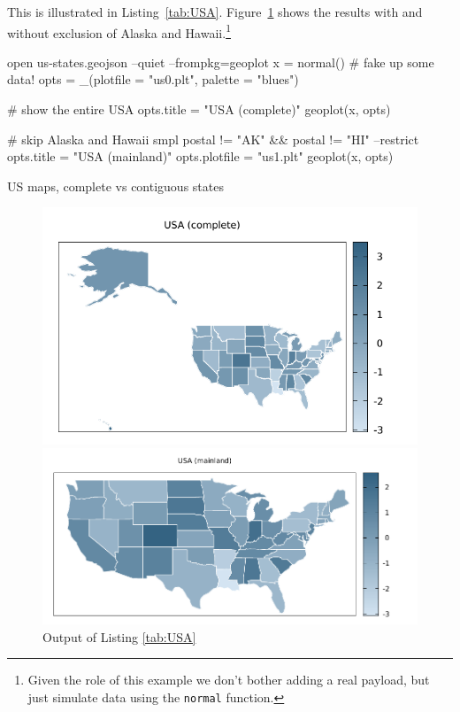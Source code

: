 \documentclass{article}
\begin{document}
This is illustrated in Listing~\ref{tab:USA}. Figure~\ref{fig:USA}
shows the results with and without exclusion of Alaska and
Hawaii.\footnote{Given the role of this example we don't bother adding
  a real payload, but just simulate data using the \texttt{normal}
  function.}

\begin{script}[p]
  \begin{scode}
open us-states.geojson --quiet --frompkg=geoplot
x = normal() # fake up some data!
opts = _(plotfile = "us0.plt", palette = "blues")

# show the entire USA
opts.title = "USA (complete)"
geoplot(x, opts)

# skip Alaska and Hawaii
smpl postal != "AK" && postal != "HI" --restrict
opts.title = "USA (mainland)"
opts.plotfile = "us1.plt"
geoplot(x, opts)
  \end{scode}
  \caption{US maps, complete vs contiguous states}
  \label{tab:USA}
\end{script}

\begin{figure}[p]
  \begin{center}
  \includegraphics[scale=0.9]{us0.pdf}

  \includegraphics[scale=0.9]{us1.pdf}
\end{center}
\caption{Output of Listing \ref{tab:USA}}
\label{fig:USA}
\end{figure}
\end{document}
